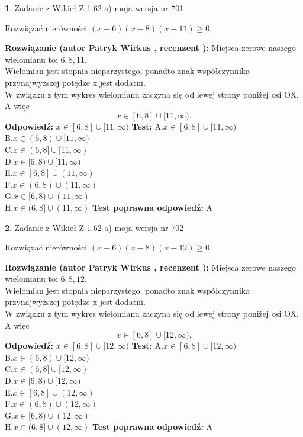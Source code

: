 \documentclass[12pt, a4paper]{article}
\theoremstyle{definition} %
\newtheorem{zad}{}
\newcommand{\zadStart}[1]{\begin{zad}#1\newline}
\newcommand{\zadStop}{\end{zad}}
\newcommand{\rozwStart}[2]{\noindent \textbf{Rozwiązanie (autor #1 , recenzent #2): }\newline}
\newcommand{\rozwStop}{\newline}
\newcommand{\odpStart}{\noindent \textbf{Odpowiedź:}\newline}
\newcommand{\odpStop}{\newline}
\newcommand{\testStart}{\noindent \textbf{Test:}\newline}
\newcommand{\testStop}{\newline}
\newcommand{\kluczStart}{\noindent \textbf{Test poprawna odpowiedź:}\newline}
\newcommand{\kluczStop}{\newline}
\begin{document}
\zadStart{Zadanie z Wikieł Z 1.62 a) moja wersja nr 701}

Rozwiązać nierówności $(x-6)(x-8)(x-11)\ge0$.
\zadStop
\rozwStart{Patryk Wirkus}{}
Miejsca zerowe naszego wielomianu to: $6, 8, 11$.\\
Wielomian jest stopnia nieparzystego, ponadto znak współczynnika przy\linebreak najwyższej potędze x jest dodatni.\\ W związku z tym wykres wielomianu zaczyna się od lewej strony poniżej osi OX. A więc $$x \in [6,8] \cup [11,\infty).$$
\rozwStop
\odpStart
$x \in [6,8] \cup [11,\infty)$
\odpStop
\testStart
A.$x \in [6,8] \cup [11,\infty)$\\
B.$x \in (6,8) \cup [11,\infty)$\\
C.$x \in (6,8] \cup [11,\infty)$\\
D.$x \in [6,8) \cup [11,\infty)$\\
E.$x \in [6,8] \cup (11,\infty)$\\
F.$x \in (6,8) \cup (11,\infty)$\\
G.$x \in [6,8) \cup (11,\infty)$\\
H.$x \in (6,8] \cup (11,\infty)$
\testStop
\kluczStart
A
\kluczStop



\zadStart{Zadanie z Wikieł Z 1.62 a) moja wersja nr 702}

Rozwiązać nierówności $(x-6)(x-8)(x-12)\ge0$.
\zadStop
\rozwStart{Patryk Wirkus}{}
Miejsca zerowe naszego wielomianu to: $6, 8, 12$.\\
Wielomian jest stopnia nieparzystego, ponadto znak współczynnika przy\linebreak najwyższej potędze x jest dodatni.\\ W związku z tym wykres wielomianu zaczyna się od lewej strony poniżej osi OX. A więc $$x \in [6,8] \cup [12,\infty).$$
\rozwStop
\odpStart
$x \in [6,8] \cup [12,\infty)$
\odpStop
\testStart
A.$x \in [6,8] \cup [12,\infty)$\\
B.$x \in (6,8) \cup [12,\infty)$\\
C.$x \in (6,8] \cup [12,\infty)$\\
D.$x \in [6,8) \cup [12,\infty)$\\
E.$x \in [6,8] \cup (12,\infty)$\\
F.$x \in (6,8) \cup (12,\infty)$\\
G.$x \in [6,8) \cup (12,\infty)$\\
H.$x \in (6,8] \cup (12,\infty)$
\testStop
\kluczStart
A
\kluczStop
\end{document}
